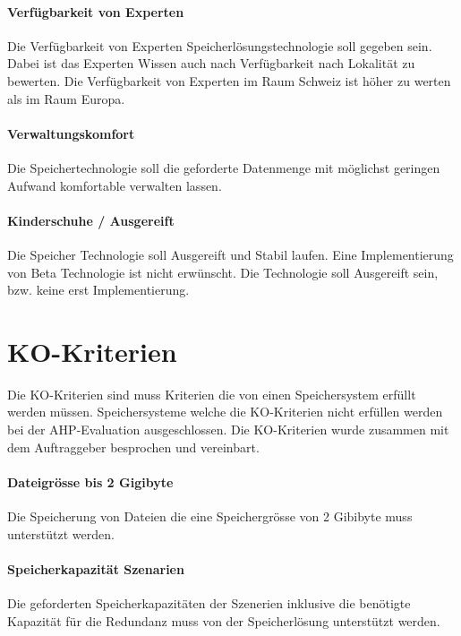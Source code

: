 \paragraph{Verfügbarkeit von Experten}\label{Soll-6-3}
Die Verfügbarkeit von Experten Speicherlösungstechnologie soll gegeben sein. Dabei ist das Experten Wissen auch nach Verfügbarkeit nach Lokalität zu bewerten. Die Verfügbarkeit von Experten im Raum Schweiz ist höher zu werten als im Raum Europa.

\paragraph{Verwaltungskomfort}\label{Soll-6-4}
Die Speichertechnologie soll die geforderte Datenmenge mit möglichst geringen Aufwand komfortable verwalten lassen.

\paragraph{Kinderschuhe / Ausgereift}\label{Soll-6-5}
Die Speicher Technologie soll Ausgereift und Stabil laufen. Eine Implementierung von Beta Technologie ist nicht erwünscht.
Die Technologie soll Ausgereift sein, bzw. keine erst Implementierung.

\section{KO-Kriterien}
Die KO-Kriterien sind muss Kriterien die von einen Speichersystem erfüllt werden müssen. Speichersysteme welche die KO-Kriterien nicht erfüllen werden bei der AHP-Evaluation ausgeschlossen. Die KO-Kriterien wurde zusammen mit dem Auftraggeber besprochen und vereinbart.

\setcounter{paragraph}{0}
\renewcommand\theparagraph{KO-\arabic{paragraph}}

\paragraph{Dateigrösse bis 2 Gigibyte}\label{KO-1}
Die Speicherung von Dateien die eine Speichergrösse von 2 Gibibyte muss unterstützt werden.

\paragraph{Speicherkapazität Szenarien}\label{KO-2}
Die geforderten Speicherkapazitäten der Szenerien inklusive die benötigte Kapazität für die Redundanz muss von der Speicherlösung unterstützt werden.

